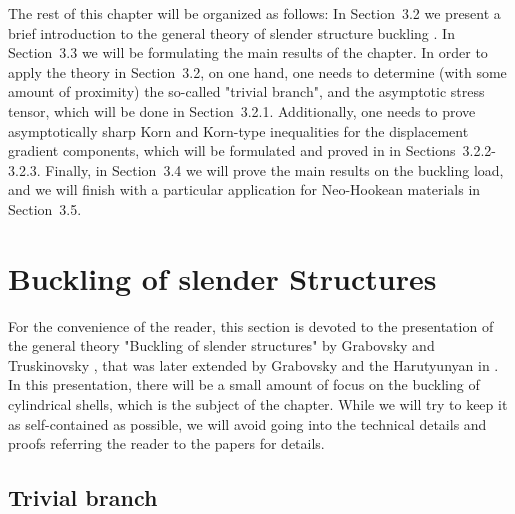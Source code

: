The rest of this chapter will be organized as follows: In Section~3.2 we present a brief introduction to the general theory of slender structure buckling \cite{bib:Gra.Har.2,bib:Gra.Tru.}. 
In Section~3.3 we will be formulating the main results of the chapter. In order to apply the theory in Section~3.2, on one hand, one needs to determine 
(with some amount of proximity) the so-called "trivial branch", and the asymptotic stress tensor, which will be done in Section~3.2.1. Additionally, one needs to prove asymptotically sharp Korn and Korn-type inequalities for the displacement gradient components, which will be formulated and proved in in Sections~3.2.2-3.2.3. Finally, in Section~3.4 we will prove the main results on the buckling load, and we will finish with a particular application for Neo-Hookean materials in Section~3.5.

\section{Buckling of slender Structures}
\label{sec:2}
\setcounter{equation}{0}


For the convenience of the reader, this section is devoted to the presentation of the general theory "Buckling of slender structures" by Grabovsky and Truskinovsky \cite{bib:Gra.Tru.}, that was later extended by Grabovsky and the Harutyunyan in \cite{bib:Gra.Har.2}. In this presentation, there will be a small amount of focus on the buckling of cylindrical shells, which is the subject of the chapter. While we will try to keep it as self-contained as possible, we will avoid going into the technical details and proofs referring the reader to the papers \cite{bib:Gra.Tru.,bib:Gra.Har.2} for details. 

\subsection{Trivial branch}
\label{sec:2.2}

